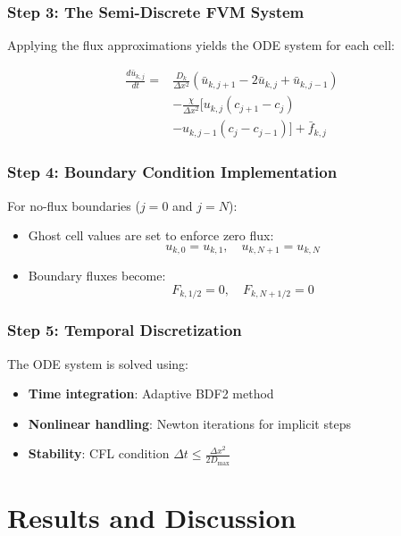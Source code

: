 \documentclass[conference]{IEEEtran}
\begin{document}
\subsubsection{Step 3: The Semi-Discrete FVM System}

Applying the flux approximations yields the ODE system for each cell:

\begin{equation}
\begin{aligned}
\frac{d\bar{u}_{k,j}}{dt} = &\frac{D_k}{\Delta x^2}(\bar{u}_{k,j+1} - 2\bar{u}_{k,j} + \bar{u}_{k,j-1}) \\
&- \frac{\chi}{\Delta x^2}\big[u_{k,j}(c_{j+1}-c_j) \\
&- u_{k,j-1}(c_j-c_{j-1})\big] + \bar{f}_{k,j}
\end{aligned}
\end{equation}

\subsubsection{Step 4: Boundary Condition Implementation}

For no-flux boundaries ($j=0$ and $j=N$):
\begin{itemize}
    \item Ghost cell values are set to enforce zero flux:
    \[ u_{k,0} = u_{k,1}, \quad u_{k,N+1} = u_{k,N} \]
    
    \item Boundary fluxes become:
    \[ F_{k,1/2} = 0, \quad F_{k,N+1/2} = 0 \]
\end{itemize}

\subsubsection{Step 5: Temporal Discretization}

The ODE system is solved using:
\begin{itemize}
    \item \textbf{Time integration}: Adaptive BDF2 method
    \item \textbf{Nonlinear handling}: Newton iterations for implicit steps
    \item \textbf{Stability}: CFL condition $\Delta t \leq \frac{\Delta x^2}{2D_{\text{max}}}$
\end{itemize}

\section{Results and Discussion}
\end{document}
